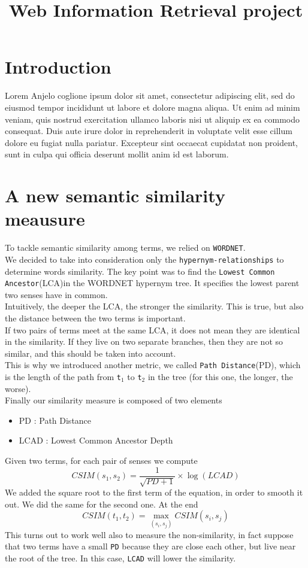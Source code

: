 \documentclass[jou,apacite]{apa6}
\title{Web Information Retrieval project}
\begin{document}
   


\section{Introduction}
Lorem Anjelo coglione ipsum dolor sit amet, consectetur adipiscing elit, sed do eiusmod tempor incididunt ut labore et dolore magna aliqua. Ut enim ad minim veniam, quis nostrud exercitation ullamco laboris nisi ut aliquip ex ea commodo consequat. Duis aute irure dolor in reprehenderit in voluptate velit esse cillum dolore eu fugiat nulla pariatur. Excepteur sint occaecat cupidatat non proident, sunt in culpa qui officia deserunt mollit anim id est laborum.
\section{A new semantic similarity meausure}
To tackle semantic similarity among terms, we relied on \texttt{WORDNET}.\\
We decided to take into consideration only the \texttt{hypernym-relationships} to determine words similarity. The key point was to find the \texttt{Lowest Common Ancestor}(LCA)in the WORDNET hypernym tree. It specifies the lowest parent two senses have in common.\\
Intuitively, the deeper the LCA, the stronger the similarity. This is true, but also the distance between the two terms is important.\\
If two pairs of terms meet at the same LCA, it does not mean they are identical in the similarity. If they live on two separate branches, then they are not so similar, and this should be taken into account.\\
This is why we introduced another metric, we called \texttt{Path Distance}(PD), which is the length of the path from \texttt{t$_1$} to \texttt{t$_2$} in the tree (for this one, the longer, the worse).\\
Finally our similarity measure is composed of two elements
\begin{itemize}
\item PD : Path Distance
\item LCAD : Lowest Common Ancestor Depth
\end{itemize}
Given two terms, for each pair of senses we compute
\begin{equation}
CSIM(s_1,s_2) = \frac{1}{\sqrt{PD+1}} \times \log(LCAD)
\end{equation}
We added the square root to the first term of the equation, in order to smooth it out. We did the same for the second one.
At the end
\begin{equation}
CSIM(t_1,t_2) = \max_{(s_i,s_j)} CSIM(s_i,s_j)
\end{equation}
This turns out to work well also to measure the non-similarity, in fact suppose that two terms have a small \texttt{PD} because they are close each other, but live near the root of the tree. In this case, \texttt{LCAD} will lower the similarity.

\end{document}
